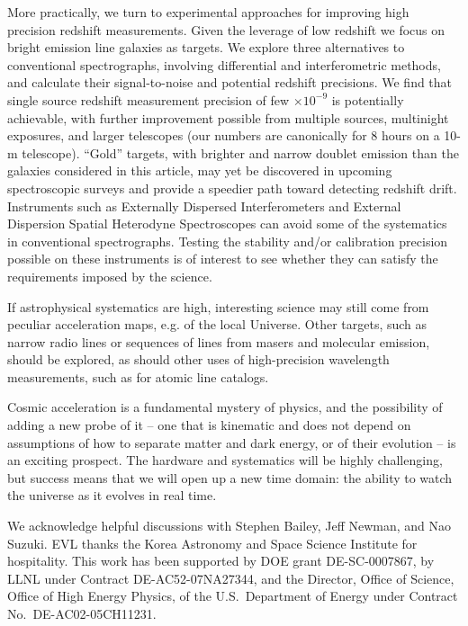 \documentclass[preprint2, 10pt]{aastex}
\begin{document}
More practically, we turn to experimental approaches for improving high 
precision redshift measurements. Given the leverage of low redshift 
we focus on bright emission line galaxies as targets. We explore three 
alternatives to conventional spectrographs, involving differential and 
interferometric methods, and calculate their signal-to-noise 
and potential redshift precisions. We find that single source redshift 
measurement precision of few $\times 10^{-9}$ is potentially achievable, 
with further improvement possible from multiple sources, multinight 
exposures, and larger telescopes (our numbers are canonically for 8 hours 
on a 10-m telescope). ``Gold'' targets, with brighter and narrow doublet
emission than the galaxies considered in this article, may yet be discovered
in upcoming spectroscopic surveys and provide a speedier path toward
detecting redshift drift. 
Instruments 
such as Externally Dispersed Interferometers and External Dispersion Spatial 
Heterodyne Spectroscopes can avoid some of the systematics in conventional 
spectrographs. 
Testing the stability and/or calibration precision possible on these 
instruments is of interest to see whether they can satisfy the requirements 
imposed by the science. 

If astrophysical systematics are high, interesting science may still come 
from peculiar acceleration maps, e.g. of the local Universe. 
Other targets, such as narrow radio lines or sequences of lines
from masers and molecular emission, should be 
explored, as should other uses of high-precision wavelength measurements, 
such as for atomic line catalogs. 

Cosmic acceleration is a fundamental mystery of physics, and the possibility 
of adding a new probe of it -- one that is kinematic and does not depend on 
assumptions of how to separate matter and dark energy, or of their evolution -- 
is an exciting prospect. The hardware and systematics will be highly 
challenging, but success means that we will open up a new time domain: the 
ability to watch the universe as it evolves in real time. 


\acknowledgments 

We acknowledge helpful discussions with Stephen Bailey, Jeff Newman, and 
Nao Suzuki. EVL thanks the 
Korea Astronomy and Space Science Institute for hospitality. 
This work has been supported by DOE grant DE-SC-0007867,
by LLNL under Contract DE-AC52-07NA27344, and the Director, 
Office of Science, Office of High Energy Physics, 
of the U.S.\ Department of Energy under Contract No.\ DE-AC02-05CH11231. 




\end{document}
